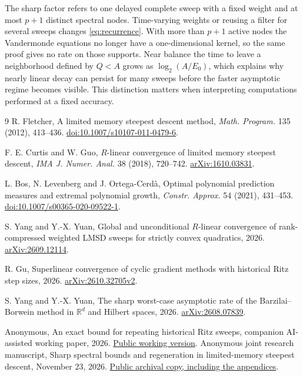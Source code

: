 \documentclass[11pt,a4paper]{article}
\numberwithin{equation}{section}
\newcommand{\R}{\mathbb R}
\begin{document}
The sharp factor refers to one delayed complete sweep with a fixed weight and at most \(p+1\) distinct spectral nodes. Time-varying weights or reusing a filter for several sweeps changes \eqref{eq:recurrence}. With more than \(p+1\) active nodes the Vandermonde equations no longer have a one-dimensional kernel, so the same proof gives no rate on those supports. Near balance the time to leave a neighborhood defined by \(Q<A\) grows as \(\log_2(A/E_0)\), which explains why nearly linear decay can persist for many
sweeps before the faster asymptotic regime becomes visible.
This distinction matters when interpreting computations performed
at a fixed accuracy.

\begin{thebibliography}{9}\small\setlength{\itemsep}{2pt}
 R. Fletcher, A limited memory steepest descent method,
\emph{Math. Program.} 135 (2012), 413--436.
\href{https://doi.org/10.1007/s10107-011-0479-6}{doi:10.1007/s10107-011-0479-6}.

 F. E. Curtis and W. Guo, \(R\)-linear convergence of limited memory steepest descent,
\emph{IMA J. Numer. Anal.} 38 (2018), 720--742.
\href{https://arxiv.org/abs/1610.03831}{arXiv:1610.03831}.

 L. Bos, N. Levenberg and J. Ortega-Cerd\`a, Optimal polynomial prediction measures and extremal polynomial growth,
\emph{Constr. Approx.} 54 (2021), 431--453.
\href{https://doi.org/10.1007/s00365-020-09522-1}{doi:10.1007/s00365-020-09522-1}.

 S. Yang and Y.-X. Yuan, Global and unconditional \(R\)-linear convergence of rank-compressed weighted LMSD sweeps for strictly convex quadratics,
2026. \href{https://arxiv.org/abs/2609.12114}{arXiv:2609.12114}.

 R. Gu, Superlinear convergence of cyclic gradient methods with historical Ritz step sizes,
2026. \href{https://arxiv.org/abs/2610.32705v2}{arXiv:2610.32705v2}.

 S. Yang and Y.-X. Yuan, The sharp worst-case asymptotic rate of the Barzilai--Borwein method in \(\R^d\) and Hilbert spaces,
2026. \href{https://arxiv.org/abs/2608.07839}{arXiv:2608.07839}.

 Anonymous, An exact bound for repeating historical Ritz sweeps,
companion AI-assisted working paper, 2026.
\href{https://taitai2025.github.io/assets/documents/research/ritz-reuse.pdf}{Public working version}.
 Anonymous joint research manuscript,
Sharp spectral bounds and regeneration in limited-memory steepest descent,
November 23, 2026. \href{https://taitai2025.github.io/assets/documents/research/lmsd-spectral.pdf}{Public archival copy, including the appendices}.
\end{thebibliography}
\end{document}
